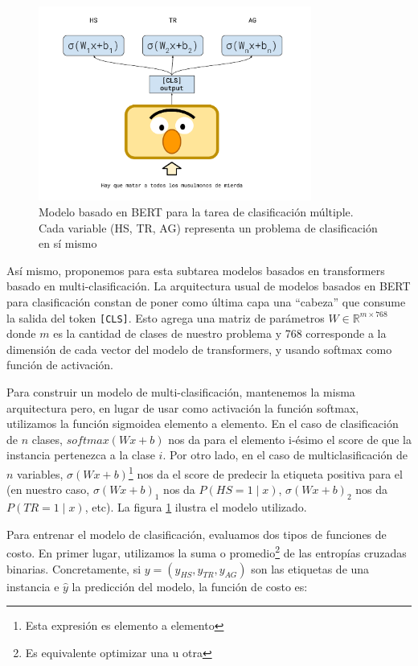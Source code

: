 \begin{figure}
    \centering
    \includegraphics[width=0.8\textwidth]{img/bert_model_hateval.pdf}
    \caption{Modelo basado en BERT para la tarea de clasificación múltiple. Cada variable (HS, TR, AG) representa un problema de clasificación en sí mismo}
    \label{fig:bert_hateval_classifier}
\end{figure}


Así mismo, proponemos para esta subtarea modelos basados en transformers basado en multi-clasificación. La arquitectura usual de modelos basados en BERT para clasificación constan de poner como última capa una  ``cabeza'' que consume la salida del token \verb|[CLS]|. Esto agrega una matriz de parámetros $W \in \mathbb{R}^{m \times 768}$ donde $m$ es la cantidad de clases de nuestro problema y 768 corresponde a la dimensión de cada vector del modelo de transformers, y usando softmax como función de activación.

Para construir un modelo de multi-clasificación, mantenemos la misma arquitectura pero, en lugar de usar como activación la función softmax, utilizamos la función sigmoidea elemento a elemento. En el caso de clasificación de $n$ clases, $softmax(W x + b)$ nos da para el elemento i-ésimo el score de que la instancia pertenezca a la clase $i$. Por otro lado, en el caso de multiclasificación de $n$ variables, $\sigma(W x + b)$\footnote{Esta expresión es elemento a elemento} nos da el score de predecir la etiqueta positiva para el (en nuestro caso,  $\sigma(W x + b)_1$ nos da $P( HS = 1 \mid x)$,  $\sigma(W x + b)_2$ nos da  $P(TR = 1 \mid x)$, etc). La figura \ref{fig:bert_hateval_classifier} ilustra el modelo utilizado.

Para entrenar el modelo de clasificación, evaluamos dos tipos de funciones de costo. En primer lugar, utilizamos la suma o promedio\footnote{Es equivalente optimizar una u otra} de las entropías cruzadas binarias. Concretamente, si $y = (y_{HS}, y_{TR}, y_{AG})$ son las etiquetas de una instancia e $\widehat{y}$ la predicción del modelo, la función de costo es:

